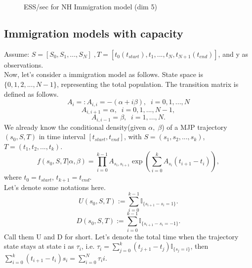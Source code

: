\begin{figure}
\begin{minipage}[!hp]{0.45\linewidth}
    \vspace{-0 in}
     \label{fig:ESS_pc_5}
  \end{minipage}
    \caption{ESS/sec for NH Immigration model (dim 5)}
  \end{figure}

  \subsection{Immigration models with capacity}
\noindent Assume: $S = [S_0,S_1, ...,S_N] \;, T = [t_0(t_{start}), t_1,...,t_N, t_{N+1}(t_{end})]$, and y as observations.\\
Now, let's consider a immigration model as follows. State space is $\{0, 1, 2, ..., N - 1\}$, representing the total population. The transition matrix is defined as follows. 
$$A_i =: A_{i,i} = -(\alpha + i\beta), \; \; i =0,1,...,N$$ $$A_{i, i+1} = \alpha, \; \; i =0,1,...,N-1,$$ $$A_{i, i-1}  = \beta, \; \;  i =1,...,N.$$
We already know the conditional density(given $\alpha,\; \beta$) of a MJP trajectory $(s_0, S, T)$ in time interval $[t_{start}, t_{end}]$, with $S=(s_1, s_2,..., s_k)$, $T=(t_1, t_2,..., t_k)$. 
$$f(s_0,S,T| \alpha, \beta) = \prod_{i=0}^{k-1} A_{s_i, s_{i+1}} \exp(\sum_{i=0}^{k} A_{s_i}(t_{i+1} - t_{i})), $$
where $t_0 = t_{start}$, $t_{k+1} = t_{end}.$\\
Let's denote some notations here.\\
$$U(s_0, S, T):= \sum_{i=0}^{k-1} \mathbb{I}_{\{s_{i+1} - s_i = 1\}}.$$
$$D(s_0, S, T):= \sum_{i=0}^{k-1} \mathbb{I}_{\{s_{i+1} - s_i = -1\}}.$$
Call them U and D for short.
Let's denote the total time when the trajectory state stays at state i as $\tau_i$, i.e. $\tau_i = \sum_{j=0}^{k} (t_{j+1} -t_j)\mathbb{I}_{\{s_j = i\}}$, then $\sum_{i=0}^k (t_{i+1} - t_i)s_i = \sum_{i=0}^N \tau_ii.$\\

